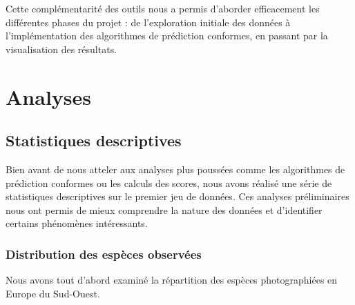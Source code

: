 \documentclass[a4paper,12pt]{article}
\begin{document}
\vspace{0.2cm}

Cette complémentarité des outils nous a permis d'aborder efficacement les différentes phases du projet : de l'exploration initiale des données à l'implémentation des algorithmes de prédiction conformes, en passant par la visualisation des résultats.


\section{Analyses}


\subsection{Statistiques descriptives}

Bien avant de nous atteler aux analyses plus poussées comme les algorithmes de prédiction conformes ou les calculs des scores, nous avons réalisé une série de statistiques descriptives sur le premier jeu de données. Ces analyses préliminaires nous ont permis de mieux comprendre la nature des données et d'identifier certains phénomènes intéressants.

\subsubsection{Distribution des espèces observées}

Nous avons tout d'abord examiné la répartition des espèces photographiées en Europe du Sud-Ouest.
\end{document}
